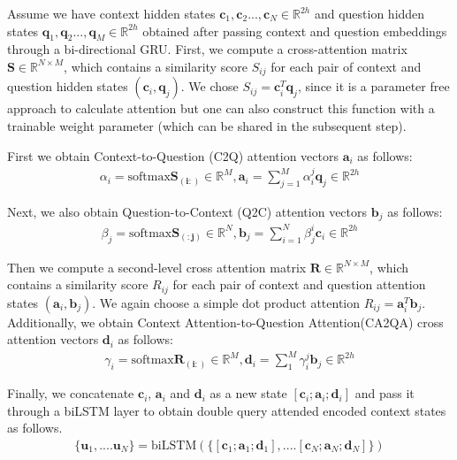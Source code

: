 \documentclass{article} %
\begin{document}
Assume we have context hidden states $\mathbf{c}_1, \mathbf{c}_2...,\mathbf{c}_N\in \mathbb{R}^{2h}$ and question hidden states $\mathbf{q}_1, \mathbf{q}_2...,\mathbf{q}_M\in \mathbb{R}^{2h}$ obtained after passing context and question embeddings through a bi-directional GRU.  First, we compute a cross-attention matrix  $\mathbf{S}\in\mathbb{R}^{N\times M}$, which contains a similarity score $S_{ij}$ for each pair of context and question hidden states $(\mathbf{c}_i,\mathbf{q}_j)$. We chose  $S_{ij}=\mathbf{c}_i^T\mathbf{q}_j$, since it is a parameter free approach to calculate attention but one can also construct this function with a trainable weight parameter (which can be shared in the subsequent step). 

First we obtain Context-to-Question (C2Q) attention vectors $\mathbf{a}_i$ as follows:
\begin{align}
\alpha_i = \text{softmax} \mathbf{S_{(i:)}}\in \mathbb{R}^M,
\mathbf{a}_i = \sum_{j=1}^{M}\alpha_i^j\mathbf{q}_j \in \mathbb{R}^{2h}
\end{align}

Next, we also obtain Question-to-Context (Q2C) attention vectors $\mathbf{b}_j$ as follows:
\begin{align}
\beta_j = \text{softmax} \mathbf{S_{(:j)}}\in \mathbb{R}^N,
\mathbf{b}_j = \sum_{i=1}^{N}\beta_j^i\mathbf{c}_i \in \mathbb{R}^{2h}
\end{align}

Then we compute a second-level cross attention matrix  $\mathbf{R}\in\mathbb{R}^{N\times M}$, which contains a similarity score $R_{ij}$ for each pair of context and question attention states $(\mathbf{a}_i, \mathbf{b}_j)$. We again choose a simple dot product attention $R_{ij}=\mathbf{a}_i^T\mathbf{b}_j$. Additionally, we obtain Context Attention-to-Question Attention(CA2QA) cross attention vectors $\mathbf{d}_i$ as follows:
\begin{align}
\gamma_i = \text{softmax} \mathbf{R_{(i:)}}\in \mathbb{R}^M,
\mathbf{d}_i = \sum_{1}^{M}\gamma_i^j\mathbf{b}_j \in \mathbb{R}^{2h}
\end{align}

Finally, we concatenate $\mathbf{c}_i$, $\mathbf{a}_i$ and $\mathbf{d}_i$ as a new state $[\mathbf{c}_i; \mathbf{a}_i; \mathbf{d}_i]$ and pass it through a biLSTM layer to obtain double query attended encoded context states as follows.
 \begin{align}
\{\mathbf{u}_1,.... \mathbf{u}_N\} = \text{biLSTM} (\{[\mathbf{c}_1; \mathbf{a}_1; \mathbf{d}_1],.... [\mathbf{c}_N; \mathbf{a}_N; \mathbf{d}_N]\})
\end{align}
\end{document}
